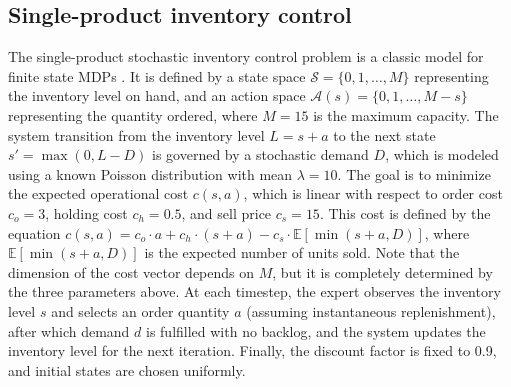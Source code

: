 \documentclass[10pt]{article} %
\begin{document}
\subsection{Single-product inventory control}
The single-product stochastic inventory control problem is a classic model for finite state MDPs \citep{Puterman1994}. It is defined by a state space $\mathcal{S} = \{0, 1, \dots, M\}$ representing the inventory level on hand, and an action space $\mathcal{A}(s) = \{0, 1, \dots, M-s\}$ representing the quantity ordered, where $M=15$ is the maximum capacity. The system transition from the inventory level $L = s+a$ to the next state $s' = \max(0, L - D)$ is governed by a stochastic demand $D$, which is modeled using a known Poisson distribution with mean $\lambda=10$. The goal is to minimize the expected operational cost $c(s, a)$, which is linear with respect to order cost $ c_o=3$, holding cost $ c_h =0.5$, and sell price $c_s=15$. This cost is defined by the equation $c(s, a) = c_o \cdot a + c_h \cdot (s + a) - c_s \cdot \mathbb{E}[\min(s+a, D)]$, where $\mathbb{E}[\min(s+a, D)]$ is the expected number of units sold. Note that the dimension of the cost vector depends on $M$, but it is completely determined by the three parameters above. At each timestep, the expert observes the inventory level $s$ and selects an order quantity $a$ (assuming instantaneous replenishment), after which demand $d$ is fulfilled with no backlog, and the system updates the inventory level for the next iteration. Finally, the discount factor is fixed to 0.9, and initial states are chosen uniformly.
\end{document}
